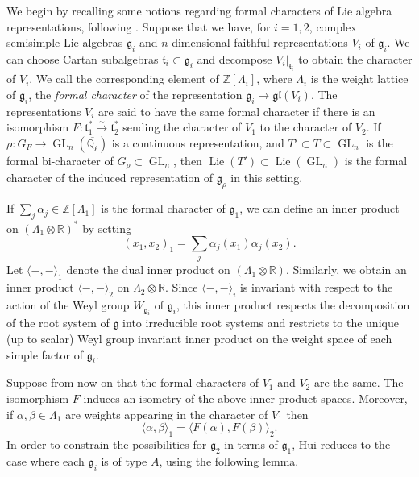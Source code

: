 \documentclass{amsart}
\theoremstyle{definition}
\numberwithin{equation}{section} %
\newcommand{\GL}{\operatorname{GL}}
\newcommand{\Lie}{\operatorname{Lie}}
\newcommand{\gllie}{\mathfrak{gl}}
\newcommand{\Qlbar}{\ensuremath{\overline{\mathbb{Q}_\ell}}}
\newcommand{\bb}[1]{\mathbb{#1}}
\newcommand{\mf}[1]{\mathfrak{#1}}
\begin{document}
We begin by recalling some notions regarding formal characters of Lie algebra representations, following \cite[\S 2]{hui2013monodromy}.
Suppose that we have, for $i=1,2$, complex semisimple Lie algebras $\mf{g}_i$ and $n$-dimensional faithful representations $V_i$ of $\mf{g}_i$. 
We can choose Cartan subalgebras $\mf{t}_i \subset \mf{g}_i$ and decompose $V_i|_{\mf{t}_i}$ to obtain the character of $V_i$.
We call the corresponding element of $\bb{Z}[\Lambda_i]$, where $\Lambda_i$ is the weight lattice of $\mf{g}_i$, the \emph{formal character} of the representation $\mf{g}_i \to \gllie(V_i)$.
The representations $V_i$ are said to have the same formal character if there is an isomorphism $F: \mf{t}_1^* \xrightarrow{\sim} \mf{t}_2^*$ sending the character of $V_1$ to the character of $V_2$. If \( \rho:G_F\to\GL_n(\Qlbar) \) is a continuous representation, and \( T'\subset T\subset \GL_n \) is the formal bi-character of \( G_\rho\subset \GL_n \), then \( \Lie(T')\subset \Lie(\GL_n) \) is the formal character of the induced representation of $\mf{g}_{\rho}$ in this setting.

If $\sum_j \alpha_j \in \bb{Z}[\Lambda_1]$ is the formal character of $\mf{g}_1$, we can define an inner product on $(\Lambda_1 \otimes \bb{R})^*$ by setting
\[
(x_1,x_2)_1 = \sum_j \alpha_j(x_1) \alpha_j(x_2).
\]
Let $\langle-,-\rangle_1$ denote the dual inner product on $(\Lambda_1 \otimes \bb{R})$.
Similarly, we obtain an inner product $\langle-,-\rangle_2$ on $\Lambda_2 \otimes \bb{R}$.
Since $\langle-,-\rangle_i$ is invariant with respect to the action of the Weyl group $W_{\mf{g}_i}$ of $\mf{g}_i$, this inner product respects the decomposition of the root system of $\mf{g}$ into irreducible root systems and restricts to the unique (up to scalar) Weyl group invariant inner product on the weight space of each simple factor of $\mf{g}_i$.

Suppose from now on that the formal characters of $V_1$ and $V_2$ are the same.
The isomorphism $F$ induces an isometry of the above inner product spaces.
Moreover, if $\alpha, \beta \in \Lambda_{1}$ are weights appearing in the character of $V_1$ then 
\begin{equation} \label{eqn: equality of inner products of weights}
\langle \alpha,\beta \rangle_1 = \langle F(\alpha),F(\beta) \rangle_2.    
\end{equation}
In order to constrain the possibilities for $\mf{g}_2$ in terms of $\mf{g}_1$, Hui reduces to the case where each $\mf{g}_i$ is of type $A$, using the following lemma.
\end{document}
